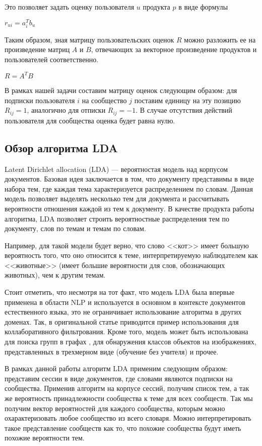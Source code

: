 \documentclass[times,specification,annotation]{itmo-student-thesis}
\begin{document}
Это позволяет задать оценку пользователя $u$ продукта $p$ в виде формулы

$r_{ui} = a_{i}^{T}b_{u}$

Таким образом, зная матрицу пользовательских оценок $R$ можно разложить ее на произведение матриц $A$ и $B$, отвечающих за векторное произведение продуктов и пользователей соответственно.

$R = A^TB$

В рамках нашей задачи составим матрицу оценок следующим образом: для подписки пользователя $i$ на сообщество $j$ поставим единицу на эту позицию $R_{ij} = 1$, аналогично для отписки $R_{ij} = - 1$. В случае отсутствия действий пользователя для сообщества оценка будет равна нулю.


\subsection{Обзор алгоритма LDA}\label{sec:lda}

Latent Dirichlet allocation (LDA) \cite{lda2003} --- вероятностая модель над корпусом документов. Базовая идея заключается в том, что документу представимы в виде набора тем, где каждая тема характеризуется распределением по словам. Данная модель позволяет выделять несколько тем для документа и рассчитывать вероятности отношения каждой из тем к документу.
В качестве продукта работы алгоритма, LDA позволяет строить вероятностные распределения тем по документу, слов по темам и темам по словам.

Например, для такой модели будет верно, что слово <<кот>> имеет большую вероятность того, что оно относится к теме, интерпретируемую наблюдателем как <<животные>> (имеет большие вероятности для слов, обозначающих животных), чем к другим темам. 

Стоит отметить, что несмотря на тот факт, что модель LDA была впервые применена в области NLP и используется в основном в контексте документов естественного языка, это не ограничивает использование алгоритма в других доменах. Так, в оригинальной статье \cite{lda2003} приводится пример использования для коллаборативного фильтрования. Кроме того, модель может быть использована для поиска групп в графах \cite{Henderson2009}, для обнаружения классов объектов на изображениях, представленных в трехмерном виде (обучение без учителя) \cite{Endres2009} и прочее.

В рамках данной работы алгоритм LDA применим следующим образом: представим сессии в виде документов, где словами являются подписки на сообщества. Применив алгоритм на корпусе сессий, получим список тем, а так же вероятность принадлежности сообщества к теме для всех сообществ. Так мы получим вектор вероятностей для каждого сообщества, которым можно охарактеризовать любое сообщество из всего словаря. Можно интерпретировать такое представление сообществ как то, что похожие сообщества будут иметь похожие вероятности тем. 
 
\end{document}
